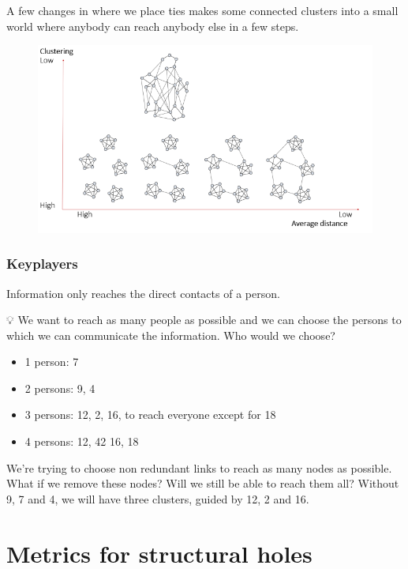 \documentclass[
  notitlepage,
  onecolumn,
  openany]{book}
\providecommand{\tightlist}{%
  \setlength{\itemsep}{0pt}\setlength{\parskip}{0pt}}
\begin{document}
A few changes in where we place ties makes some connected clusters into a small world where anybody can reach anybody else in a few steps.

\begin{figure}[h!]

{\centering \includegraphics[width=0.6\linewidth]{images/07-Triads and structural holes/Untitled 4} 

}

\end{figure}

\hypertarget{keyplayers}{%
\subsection{Keyplayers}\label{keyplayers}}

Information only reaches the direct contacts of a person.

💡 We want to reach as many people as possible and we can choose the persons to which we can communicate the information. Who would we choose?

\begin{itemize}
\tightlist
\item
  1 person: 7
\item
  2 persons: 9, 4
\item
  3 persons: 12, 2, 16, to reach everyone except for 18
\item
  4 persons: 12, 42 16, 18
\end{itemize}

We're trying to choose non redundant links to reach as many nodes as possible.
What if we remove these nodes? Will we still be able to reach them all? Without 9, 7 and 4, we will have three clusters, guided by 12, 2 and 16.

\hypertarget{metrics-for-structural-holes}{%
\chapter{Metrics for structural holes}\label{metrics-for-structural-holes}}
\end{document}
